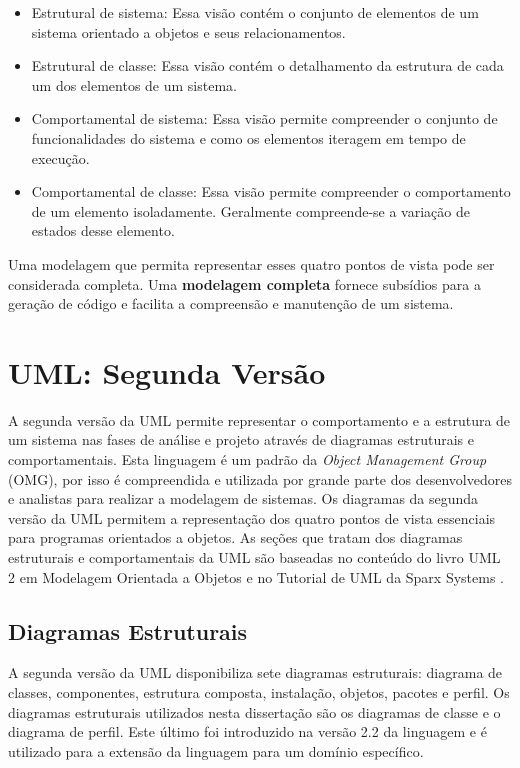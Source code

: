 \begin{itemize}
  \item Estrutural de sistema: Essa visão contém o conjunto de elementos de um
  sistema orientado a objetos e seus relacionamentos.
  \item Estrutural de classe: Essa visão contém o detalhamento da estrutura de
  cada um dos elementos de um sistema.
  \item Comportamental de sistema: Essa visão permite compreender o
  conjunto de funcionalidades do sistema e como os elementos iteragem em tempo
  de execução.
  \item Comportamental de classe: Essa visão permite compreender o comportamento
  de um elemento isoladamente. Geralmente compreende-se a variação de estados
  desse elemento.
\end{itemize}
  
Uma modelagem que permita representar esses quatro pontos de vista pode ser considerada completa. Uma \textbf{modelagem completa} fornece subsídios
para a geração de código e facilita a compreensão e manutenção de um sistema. 

\section{UML: Segunda Versão}

A segunda versão da UML \cite{uml:05} permite representar o comportamento e a estrutura de um sistema nas fases de análise e projeto
através de diagramas estruturais e comportamentais. Esta linguagem é um padrão da \textit{Object Management Group} (OMG), por isso é compreendida e utilizada por grande parte dos desenvolvedores e analistas para realizar a modelagem de sistemas. Os
diagramas da segunda versão da UML permitem a representação dos quatro pontos de vista essenciais para programas  orientados a objetos. As seções que tratam dos diagramas estruturais e
comportamentais da UML são baseadas no conteúdo do livro UML 2 em Modelagem Orientada a Objetos \cite{uml2ricardo:03} e no Tutorial de UML da Sparx
Systems \cite{sparx_tutorial}.

\subsection{Diagramas Estruturais}

A segunda versão da UML disponibiliza sete diagramas estruturais: diagrama de classes, componentes, estrutura composta, instalação, objetos,
pacotes e perfil. Os diagramas estruturais utilizados nesta dissertação são os diagramas de classe e o diagrama de perfil. Este último foi
introduzido na versão 2.2 da linguagem e é utilizado para a extensão da linguagem para um domínio específico.


